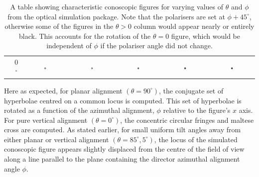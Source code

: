 \begin{center}
\begin{table}[ht]
\begin{tabular}{ccCCCCC}
&0$^{\circ}$&\includegraphics[width=0.06\textwidth]{Figures/conoscopy/table/00_90}&\includegraphics[width=0.06\textwidth]{Figures/conoscopy/table/00_85}&\includegraphics[width=0.06\textwidth]{Figures/conoscopy/table/00_45}&\includegraphics[width=0.06\textwidth]{Figures/conoscopy/table/00_05}&\includegraphics[width=0.06\textwidth]{Figures/conoscopy/table/00_00}\\
\end{tabular}
\caption[Characteristic conoscopic figures]{\label{fig:figures}A table showing characteristic conoscopic figures for varying values of $\theta$ and $\phi$ from the optical simulation package. Note that the polarisers are set at $\phi+45^{\circ}$, otherwise some of the figures in the $\theta>0$ column would appear nearly or entirely black. This accounts for the rotation of the $\theta=0$ figure, which would be independent of $\phi$ if the polariser angle did not change.}
\end{table}
\end{center}

Here as expected, for planar alignment $\left(\theta=90^{\circ}\right)$, the conjugate set of hyperbolae centred on a common locus is computed. This set of hyperbolae is rotated as a function of the azimuthal alignment, $\phi$ relative to the figure's $x$ axis. For pure vertical alignment $\left(\theta=0^{\circ}\right)$, the concentric circular fringes and maltese cross are computed. As stated earlier, for small uniform tilt angles away from either planar or vertical alignment $\left(\theta=85^{\circ},5^{\circ}\right)$, the locus of the simulated conoscopic figure appears slightly displaced from the centre of the field of view along a line parallel to the plane containing the director azimuthal alignment angle $\phi$.

